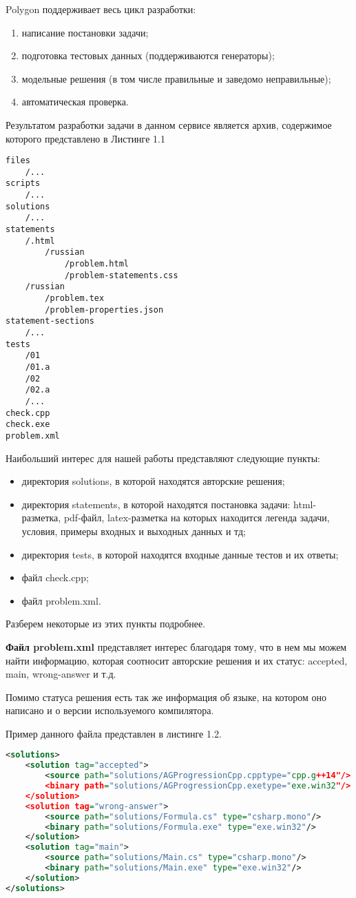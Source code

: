 Polygon поддерживает весь цикл разработки:
\begin{enumerate}
    \item написание постановки задачи;
    \item подготовка тестовых данных (поддерживаются генераторы);
    \item модельные решения (в том числе правильные и заведомо неправильные);
    \item автоматическая проверка.
\end{enumerate}

Результатом разработки задачи в данном сервисе является архив, содержимое которого представлено в Листинге 1.1
\begin{lstlisting}[caption={Содержимое архива задачи}]
files
    /...
scripts
    /...
solutions
    /...
statements
    /.html
        /russian
            /problem.html
            /problem-statements.css
    /russian
        /problem.tex
        /problem-properties.json
statement-sections
    /...
tests
    /01
    /01.a
    /02
    /02.a
    /...
check.cpp
check.exe
problem.xml
\end{lstlisting}

Наибольший интерес для нашей работы представляют следующие пункты: 
\begin{itemize}
\item директория solutions, в которой находятся авторские решения;
\item директория statements, в которой находятся постановка задачи: html-разметка, pdf-файл, latex-разметка на которых находится легенда задачи, условия, примеры входных и выходных данных и тд;
\item директория tests, в которой находятся входные данные тестов и их ответы;
\item файл check.cpp;
\item файл problem.xml.
\end{itemize}

Разберем некоторые из этих пункты подробнее.

\textbf{Файл problem.xml} представляет интерес благодаря тому, что в нем мы можем найти информацию, которая соотносит авторские решения и их статус: accepted, main, wrong-answer и т.д. 

Помимо статуса решения есть так же информация об языке, на котором оно написано и о версии используемого компилятора.

Пример данного файла представлен в листинге 1.2.

\begin{lstlisting}[caption={Пример информации об авторских решениях}, language={XML}]
<solutions>
    <solution tag="accepted">
        <source path="solutions/AGProgressionCpp.cpptype="cpp.g++14"/>
        <binary path="solutions/AGProgressionCpp.exetype="exe.win32"/>
    </solution>
    <solution tag="wrong-answer">
        <source path="solutions/Formula.cs" type="csharp.mono"/>
        <binary path="solutions/Formula.exe" type="exe.win32"/>
    </solution>
    <solution tag="main">
        <source path="solutions/Main.cs" type="csharp.mono"/>
        <binary path="solutions/Main.exe" type="exe.win32"/>
    </solution>
</solutions>
\end{lstlisting}

